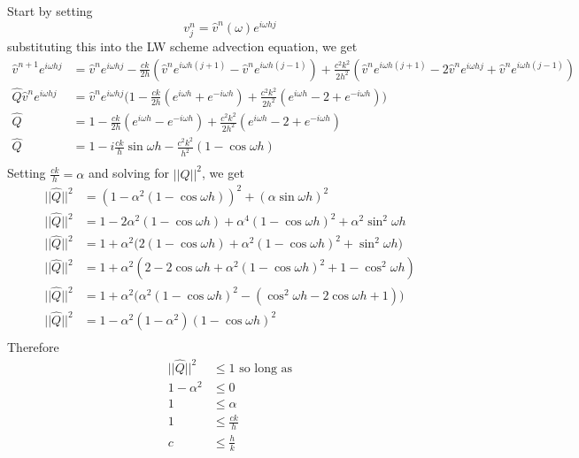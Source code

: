 \\
\\
Start by setting
\begin{equation*}
  v^n_j = \hat{v}^n(\omega)e^{i\omega hj}
\end{equation*}
substituting this into the LW scheme advection equation, we get
\begin{equation*}
\begin{align}
  \hat{v}^{n+1}e^{i\omega hj} &= \hat{v}^ne^{i\omega hj}-\frac{ck}{2h}(\hat{v}^ne^{i\omega h(j+1)} - \hat{v}^ne^{i\omega h(j-1)}) + \frac{c^2k^2}{2h^2}(\hat{v}^ne^{i\omega h(j+1)} -2\hat{v}^ne^{i\omega hj} + \hat{v}^ne^{i\omega h(j-1)}) \\
  \hat{Q}\hat{v}^ne^{i\omega hj} &= \hat{v}^ne^{i\omega hj} \big(1 - \frac{ck}{2h}(e^{i\omega h}+e^{-i\omega h}) + \frac{c^2k^2}{2h^2}(e^{i\omega h} -2+ e^{-i\omega h})\big)\\
  \hat{Q} &= 1 - \frac{ck}{2h}(e^{i\omega h}-e^{-i\omega h}) + \frac{c^2k^2}{2h^2}(e^{i\omega h} -2+ e^{-i\omega h})\\
  \hat{Q} &= 1 - i\frac{ck}{h}\sin\omega h - \frac{c^2k^2}{h^2}(1 - \cos\omega h)\\
\end{align}
\end{equation*}
Setting $\frac{ck}{h}=\alpha$ and solving for $||\hat{Q}||^2$, we get
\begin{equation*}
\begin{align}
  ||\hat{Q}||^2 &= (1 - \alpha^2(1 - \cos\omega h))^2 + (\alpha\sin\omega h)^2\\
  ||\hat{Q}||^2 &= 1 - 2\alpha^2(1 - \cos\omega h) + \alpha^4(1 - \cos\omega h)^2 + \alpha^2\sin^2\omega h\\
  ||\hat{Q}||^2 &= 1 + \alpha^2 \big( 2(1 - \cos\omega h) + \alpha^2(1 - \cos\omega h)^2 + \sin^2\omega h \big)\\
  ||\hat{Q}||^2 &= 1 + \alpha^2 ( 2 - 2\cos\omega h + \alpha^2(1 - \cos\omega h)^2 + 1 -\cos^2\omega h )\\
  ||\hat{Q}||^2 &= 1 + \alpha^2 \big( \alpha^2(1 - \cos\omega h)^2 - (\cos^2\omega h - 2\cos\omega h + 1) \big)\\
  ||\hat{Q}||^2 &= 1 - \alpha^2 (1 - \alpha^2)(1 - \cos\omega h)^2\\
\end{align}
\end{equation*}
Therefore
\begin{equation*}
\begin{align}
  ||\hat{Q}||^2 &\leq 1 \text{ so long as}\\
  1- \alpha^2 	&\leq 0 \\
  1	 	&\leq \alpha \\
  1		&\leq \frac{ck}{h} \\
  c		&\leq \frac{h}{k}
\end{align}
\end{equation*}
